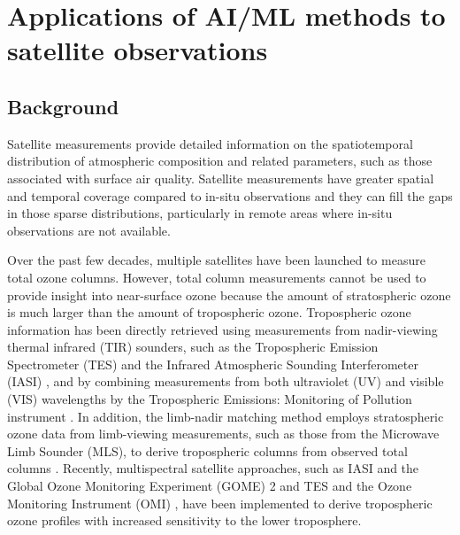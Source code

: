 \documentclass[gmd, manuscript]{copernicus}
\begin{document}
\section{Applications of AI/ML methods to satellite observations}

\subsection{Background}
Satellite measurements provide detailed information on the spatiotemporal distribution of atmospheric composition and related parameters, such as those associated with surface air quality. Satellite measurements have greater spatial and temporal coverage compared to in-situ observations and they can fill the gaps in those sparse distributions, particularly in remote areas where in-situ observations are not available. 

Over the past few decades, multiple satellites have been launched to measure total ozone columns. %
However, total column measurements cannot be used to provide insight into near-surface ozone because the amount of stratospheric ozone is much larger than the amount of tropospheric ozone. Tropospheric ozone information has been directly retrieved using measurements from nadir-viewing thermal infrared (TIR) sounders, such as the Tropospheric Emission Spectrometer (TES) \citep{bowman_capturing_2002} and the Infrared Atmospheric Sounding Interferometer (IASI) \citep{boynard_measurements_2009}, and by combining measurements from both ultraviolet (UV) and visible (VIS) wavelengths by the Tropospheric Emissions: Monitoring of Pollution instrument \citep{johnson_evaluation_2018}. In addition, the limb-nadir matching method employs stratospheric ozone data from limb-viewing measurements, such as those from the Microwave Limb Sounder (MLS), to derive tropospheric columns from observed total columns \citep{ziemke_trends_2019}. Recently, multispectral satellite approaches, such as IASI and the Global Ozone Monitoring Experiment (GOME) 2 \citep{cuesta_transboundary_2018} and TES and the Ozone Monitoring Instrument (OMI) \citep{colombi_new_2021}, have been implemented to derive tropospheric ozone profiles with increased sensitivity to the lower troposphere.  
\end{document}
